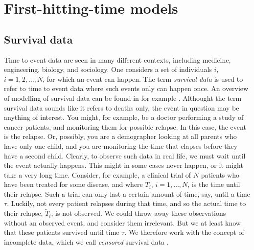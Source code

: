 \chapter{First-hitting-time models}

\section{Survival data}
Time to event data are seen in many different contexts, including medicine, engineering, biology, and sociology.
One considers a set of individuals $i$, $i=1,2,\ldots,N$, for which an event can happen.
The term \textit{survival data} is used to refer to time to event data where such events only can happen once.
An overview of modelling of survival data can be found in for example \citet{ABG}.
Althought the term survival data sounds like it refers to deaths only, the event in question may be anything of interest.
You might, for example, be a doctor performing a study of cancer patients, and monitoring them for possible relapse.
In this case, the event is the relapse.
Or, possibly, you are a demographer looking at all parents who have only one child, and you are monitoring the time that elapses before they have a second child.
Clearly, to observe such data in real life, we must wait until the event actually happens.
This might in some cases never happen, or it might take a very long time.
Consider, for example, a clinical trial of $N$ patients who have been treated for some disease, and where $T_i$, $i=1,\ldots,N$, is the time until their relapse.
Such a trial can only last a certain amount of time, say, until a time $\tau$.
Luckily, not every patient relapses during that time, and so the actual time to their relapse, $\tilde{T}_i$, is not observed.
We could throw away these observations without an observed event, and consider them irrelevant.
But we at least know that these patients survived until time $\tau$.
We therefore work with the concept of incomplete data, which we call \textit{censored} survival data \citep{ABG}.

